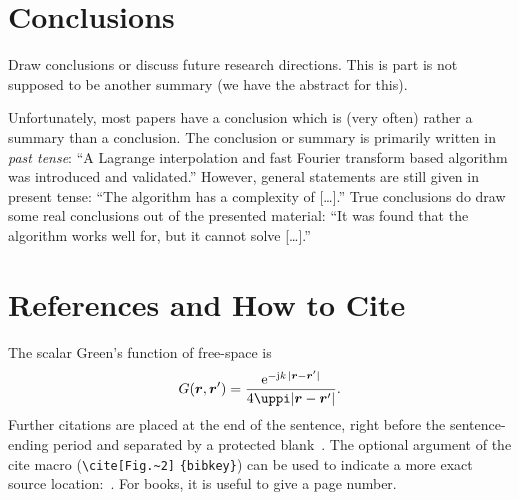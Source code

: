 \section{Conclusions} %
Draw conclusions or discuss future research directions. 
This is part is not supposed to be another summary (we have the abstract for this).

Unfortunately, most papers have a conclusion which is (very often) rather a summary than a conclusion. 
The conclusion or summary is primarily written in \emph{past tense}: 
``A Lagrange interpolation and fast Fourier transform based algorithm was introduced and validated.'' 
However, general statements are still given in present tense: 
``The algorithm has a complexity of [\dots].'' 
True conclusions do draw some real conclusions out of the presented material: 
``It was found that the algorithm works well for, but it cannot solve [\dots].''


\section{References and How to Cite} %
The scalar Green's function of free-space is \cite[p.~300]{quijano_3d_2010} 
\begin{equation}
 G \left(\veg r, \veg r'\right) = \frac{\e^{-\jm k\, \abs{\veg r - \veg r'}}}{4 \uppi \abs{\veg r - \veg r'}}.
 \label{eq:ScalarGreen}
\end{equation}
Further citations are placed at the end of the sentence, right before the sentence-ending period and separated by a protected blank~\cite{russer_overview_2009,poljak_assessment_2003,peterson_computational_1998,pozar_microwave_2011,matthei_microwave_1980}. 
The optional argument of the cite macro (\verb|\cite|\verb|[Fig.~2]|%
%
\linebreak%
%
\verb|{bibkey}|)  can be used to indicate a more exact source location:~\cite[Fig.~2]{quijano_3d_2010}. 
For books, it is useful to give a page number.

